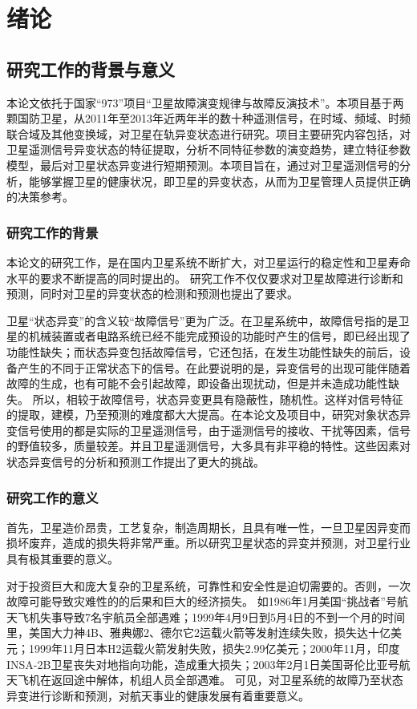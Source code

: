 
\chapter{绪论}

\section{研究工作的背景与意义}
本论文依托于国家“973”项目“卫星故障演变规律与故障反演技术”。本项目基于两颗国防卫星，从2011年至2013年近两年半的数十种遥测信号，在时域、频域、时频联合域及其他变换域，对卫星在轨异变状态进行研究。项目主要研究内容包括，对卫星遥测信号异变状态的特征提取，分析不同特征参数的演变趋势，建立特征参数模型，最后对卫星状态异变进行短期预测。本项目旨在，通过对卫星遥测信号的分析，能够掌握卫星的健康状况，即卫星的异变状态，从而为卫星管理人员提供正确的决策参考。

\subsection{研究工作的背景}
本论文的研究工作，是在国内卫星系统不断扩大，对卫星运行的稳定性和卫星寿命水平的要求不断提高的同时提出的。
研究工作不仅仅要求对卫星故障进行诊断和预测，同时对卫星的异变状态的检测和预测也提出了要求。

卫星“状态异变”的含义较“故障信号”更为广泛。在卫星系统中，故障信号指的是卫星的机械装置或者电路系统已经不能完成预设的功能时产生的信号，即已经出现了功能性缺失；而状态异变包括故障信号，它还包括，在发生功能性缺失的前后，设备产生的不同于正常状态下的信号。在此要说明的是，异变信号的出现可能伴随着故障的生成，也有可能不会引起故障，即设备出现扰动，但是并未造成功能性缺失。
所以，相较于故障信号，状态异变更具有隐蔽性，随机性。这样对信号特征的提取，建模，乃至预测的难度都大大提高。在本论文及项目中，研究对象状态异变信号使用的都是实际的卫星遥测信号，由于遥测信号的接收、干扰等因素，信号的野值较多，质量较差。并且卫星遥测信号，大多具有非平稳的特性。这些因素对状态异变信号的分析和预测工作提出了更大的挑战。

\subsection{研究工作的意义}
首先，卫星造价昂贵，工艺复杂，制造周期长，且具有唯一性，一旦卫星因异变而损坏废弃，造成的损失将非常严重。所以研究卫星状态的异变并预测，对卫星行业具有极其重要的意义。

对于投资巨大和庞大复杂的卫星系统，可靠性和安全性是迫切需要的。否则，一次故障可能导致灾难性的的后果和巨大的经济损失。
如1986年1月美国“挑战者”号航天飞机失事导致7名宇航员全部遇难；1999年4月9日到5月4日的不到一个月的时间里，美国大力神4B、雅典娜2、德尔它2运载火箭等发射连续失败，损失达十亿美元；1999年11月日本H2运载火箭发射失败，损失2.99亿美元；2000年11月，印度INSA-2B卫星丧失对地指向功能，造成重大损失；2003年2月1日美国哥伦比亚号航天飞机在返回途中解体，机组人员全部遇难。
可见，对卫星系统的故障乃至状态异变进行诊断和预测，对航天事业的健康发展有着重要意义。

